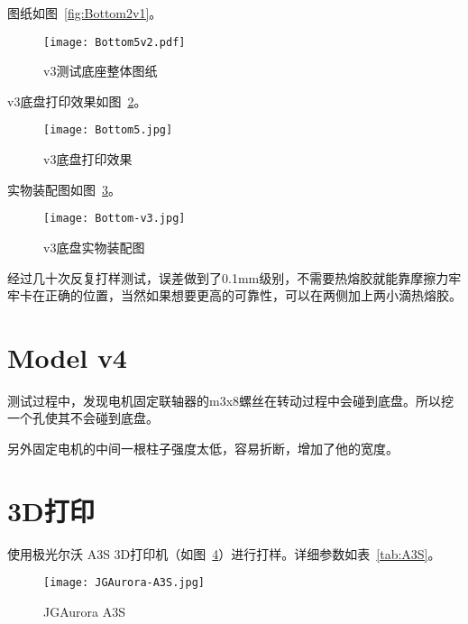 图纸如图~\ref{fig:Bottom2v1}。

\begin{figure}[htbp]
    \centering
    \texttt{[image: Bottom5v2.pdf]}
    \caption{v3测试底座整体图纸}
    \label{fig:Bottom5v2}
\end{figure}

v3底盘打印效果如图~\ref{fig:Bottom5}。

\begin{figure}[htbp]
    \centering
    \texttt{[image: Bottom5.jpg]}
    \caption{v3底盘打印效果}
    \label{fig:Bottom5}
\end{figure}

实物装配图如图~\ref{fig:Bottom-v3}。

\begin{figure}[htbp]
    \centering
    \texttt{[image: Bottom-v3.jpg]}
    \caption{v3底盘实物装配图}
    \label{fig:Bottom-v3}
\end{figure}

经过几十次反复打样测试，误差做到了0.1mm级别，不需要热熔胶就能靠摩擦力牢牢卡在正确的位置，当然如果想要更高的可靠性，可以在两侧加上两小滴热熔胶。

\section{Model v4}

测试过程中，发现电机固定联轴器的m3x8螺丝在转动过程中会碰到底盘。所以挖一个孔使其不会碰到底盘。

另外固定电机的中间一根柱子强度太低，容易折断，增加了他的宽度。

\section{3D打印}

使用极光尔沃 A3S 3D打印机（如图~\ref{fig:A3S}）进行打样。详细参数如表~\ref{tab:A3S}。

\begin{figure}[htbp]
    \centering
    \texttt{[image: JGAurora-A3S.jpg]}
    \caption{JGAurora A3S}
    \label{fig:A3S}
\end{figure}

